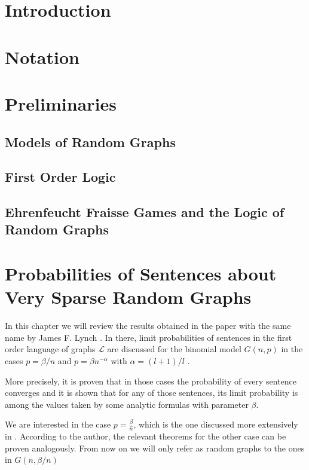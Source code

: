 \documentclass[11pt,notitlepage]{report}
\theoremstyle{definition}
\theoremstyle{remark}
\begin{document}
\tableofcontents

\chapter*{Introduction}

\chapter*{Notation}



\chapter{Preliminaries}


\section{Models of Random Graphs}

\section{First Order Logic}

\section{Ehrenfeucht Fraisse Games and the Logic of Random Graphs}



\chapter{Probabilities of Sentences about Very Sparse Random Graphs}


In this chapter we will review the results obtained
 in the paper with the same name by James F. Lynch \cite{lynch1992probabilities}.
In there, limit probabilities of sentences in the first order language of graphs $\mathcal{L}$
are discussed for the binomial model $G(n,p)$ in the cases $p=\beta/n$ and
$p=\beta n^{-\alpha}$ with $\alpha=(l+1)/l$ . \par

More precisely, it is proven that in those cases the 
probability of every sentence converges and it is shown
that for any of those sentences, its limit probability 
is among the values taken by some analytic formulas
with parameter $\beta$. \par

We are interested in the case $p=\frac{\beta}{n}$, which is 
the one discussed more extensively in \cite{lynch1992probabilities}. 
According to the author, the relevant theorems for 
the other case can be proven analogously. From now on we
will only refer as random graphs to the ones in $G(n,\beta/n)$\par
\end{document}
